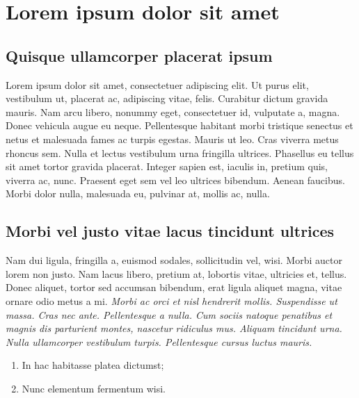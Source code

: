 
\section{Lorem ipsum dolor sit amet}

\subsection{Quisque ullamcorper placerat ipsum}

Lorem ipsum dolor sit amet, consectetuer adipiscing elit. Ut purus elit, vestibulum ut, placerat ac, adipiscing vitae, felis. Curabitur dictum gravida mauris. Nam arcu libero, nonummy eget, consectetuer id, vulputate a, magna. Donec vehicula augue eu neque. Pellentesque habitant morbi tristique senectus et netus et malesuada fames ac turpis egestas. Mauris ut leo. Cras viverra metus rhoncus sem. Nulla et lectus vestibulum urna fringilla ultrices.  Phasellus eu tellus sit amet tortor gravida placerat. Integer sapien est, iaculis in, pretium quis, viverra ac, nunc. Praesent eget sem vel leo ultrices bibendum. Aenean faucibus. Morbi dolor nulla, malesuada eu, pulvinar at, mollis ac, nulla. %

\subsection{Morbi vel justo vitae lacus tincidunt ultrices}

Nam dui ligula, fringilla a, euismod sodales, sollicitudin vel, wisi. Morbi auctor lorem non justo. Nam lacus libero, pretium at, lobortis vitae, ultricies et, tellus. Donec aliquet, tortor sed accumsan bibendum, erat ligula aliquet magna, vitae ornare odio metus a mi. \textit{Morbi ac orci et nisl hendrerit mollis. Suspendisse ut massa. Cras nec ante. Pellentesque a nulla. Cum sociis natoque penatibus et magnis dis parturient montes, nascetur ridiculus mus. Aliquam tincidunt urna. Nulla ullamcorper vestibulum turpis. Pellentesque cursus luctus mauris.}

\begin{enumerate}
\item In hac habitasse platea dictumst;
\item Nunc elementum fermentum wisi.
\end{enumerate}


